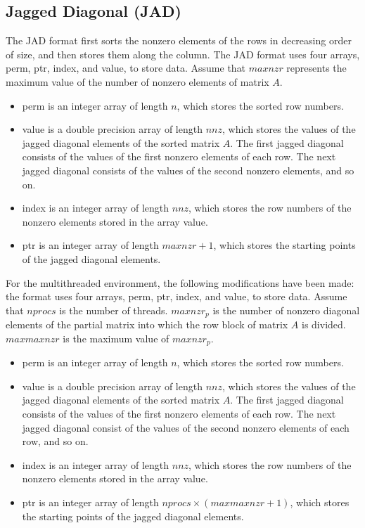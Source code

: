 \documentclass[a4paper]{article}
\begin{document}
\newpage
\subsection{Jagged Diagonal (JAD)}
The JAD format first sorts the nonzero elements of the rows in decreasing order of
size, and then stores them along the column. The JAD format uses four
arrays, {\ttfamily perm}, {\ttfamily ptr}, {\ttfamily index}, and {\ttfamily
value}, to store data. Assume that $maxnzr$ represents the maximum value
of the number of nonzero elements of matrix $A$.
\begin{itemize}
\item {\ttfamily perm} is an integer array of length $n$, which stores the sorted row numbers.
\item {\ttfamily value} is a double precision array of length 
      $nnz$, which stores the values of the jagged diagonal elements of the sorted matrix $A$. The
      first jagged diagonal consists of the values of the first nonzero elements of
      each row. The next jagged diagonal consists of the values of the second nonzero 
      elements, and so on. 
\item {\ttfamily index} is an integer array of length $nnz$,
      which stores the row numbers of the nonzero elements stored in
      the array {\ttfamily value}.
\item {\ttfamily ptr} is an integer array of length $maxnzr+1$,
      which stores the starting points of the jagged diagonal elements.
\end{itemize}

For the multithreaded environment, the following modifications have been made:
the format uses four arrays, {\ttfamily perm}, {\ttfamily ptr}, {\ttfamily
index}, and {\ttfamily value}, to store data. Assume that $nprocs$ is the
number of threads.
$maxnzr_p$ is the number of nonzero diagonal elements of the partial matrix into which the row block of matrix $A$ is divided.
$maxmaxnzr$ is the maximum value of $maxnzr_p$.
\begin{itemize}
\item {\ttfamily perm} is an integer array of length $n$, which stores the sorted row numbers.
\item {\ttfamily value} is a double precision array of length 
      $nnz$, which stores the values of the jagged diagonal elements of the sorted matrix $A$. The
      first jagged diagonal consists of the values of the first nonzero elements of
      each row. The next jagged diagonal consist of the values of the second
      nonzero elements of each row, and so on. 
\item {\ttfamily index} is an integer array of length $nnz$,
      which stores the row numbers of the nonzero elements stored in
      the array {\ttfamily value}.
\item {\ttfamily ptr} is an integer array of length $nprocs
      \times (maxmaxnzr + 1)$, which stores the starting points of the
      jagged diagonal elements.
\end{itemize}
\end{document}
